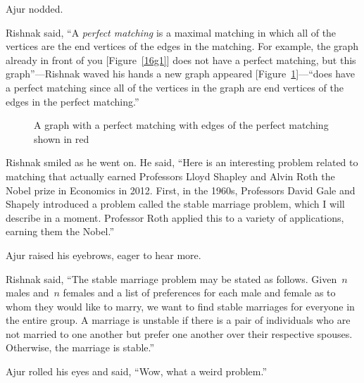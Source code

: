 Ajur nodded.

Rishnak said, ``A \textit{perfect matching} is a maximal matching in which all of the vertices are the end vertices of the edges in the matching. For example, the graph already in front of you [Figure~\ref{16g1}] does not have a perfect matching, but this graph''---Rishnak waved his hands a new graph appeared [Figure~\ref{16g2}]---``does have a perfect matching since all of the vertices in the graph are end vertices of the edges in the perfect matching.''

\begin{figure}
\begin{center}
\caption{A graph with a perfect matching with edges of the perfect matching shown in red}\label{16g2}
\end{center}
\end{figure}

Rishnak smiled as he went on. He said, ``Here is an interesting problem related to matching that actually earned Professors Lloyd Shapley and Alvin Roth the Nobel prize in Economics in 2012.  First, in the 1960s, Professors David Gale and Shapely introduced a problem called the stable marriage problem, which I will describe in a moment. Professor Roth applied this to a variety of applications, earning them the Nobel.''

Ajur raised his eyebrows, eager to hear more.

Rishnak said, ``The stable marriage problem may be stated as follows. Given~$n$ males and~$n$ females and a list of preferences for each male and female as to whom they would like to marry, we want to find stable marriages for everyone in the entire group.
A marriage is unstable if there is a pair of individuals who are not married to one another but prefer one another over their respective spouses. Otherwise, the marriage is stable.''

Ajur rolled his eyes and said, ``Wow, what a weird problem.''

